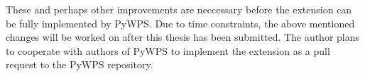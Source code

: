 These and perhaps other improvements are neccessary before the
extension can be fully implemented by PyWPS. Due to time constraints,
the above mentioned changes will be worked on after this thesis has
been submitted. The author plans to cooperate with authors of PyWPS to
implement the extension as a pull request to the PyWPS repository.

